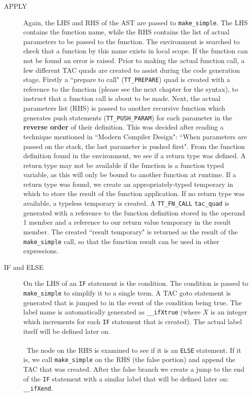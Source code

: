 \begin{description}
	\item[APPLY] Again, the LHS and RHS of the AST are passed to \verb!make_simple!. The LHS contains the function name, while the RHS contains the list of actual parameters to be passed to the function. The environment is searched to check that a function by this name exists in local scope. If the function can not be found an error is raised. Prior to making the actual function call, a few different TAC quads are created to assist during the code generation stage. Firstly a ``prepare to call" (\verb!TT_PREPARE!) quad is created with a reference to the function (please see the next chapter for the syntax), to instruct that a function call is about to be made. Next, the actual parameters list (RHS) is passed to another recursive function which generates push statements (\verb!TT_PUSH_PARAM!) for each parameter in the \textbf{reverse order} of their definition. This was decided after reading a technique mentioned in ``Modern Compiler Design"\cite{grune2000}: ``When parameters are passed on the stack, the last parameter is pushed first". From the function definition found in the environment, we see if a return type was defined. A return type may not be available if the function is a function typed variable, as this will only be bound to another function at runtime. If a return type was found, we create an appropriately-typed temporary in which to store the result of the function application. If no return type was available, a typeless temporary is created. A \verb!TT_FN_CALL! \verb!tac_quad! is generated with a reference to the function definition stored in the operand 1 member and a reference to our return value temporary in the result member. The created ``result temporary" is returned as the result of the \verb!make_simple! call, so that the function result can be used in other expressions. 
	\item[IF and ELSE] On the LHS of an \verb!IF! statement is the condition. The condition is passed to \verb!make_simple! to simplify it to a single term. A TAC goto statement is generated that is jumped to in the event of the condition being true. The label name is automatically generated as \verb!__ifXtrue! (where $X$ is an integer which increments for each \verb!IF! statement that is created). The actual label itself will be defined later on.
\\ \ \\ \
The node on the RHS is examined to see if it is an \verb!ELSE! statement. If it is, we call \verb!make_simple! on the RHS (the false portion) and append the TAC that was created. After the false branch we create a jump to the end of the \verb!IF! statement with a similar label that will be defined later on: \verb!__ifXend!. 

\end{description}
